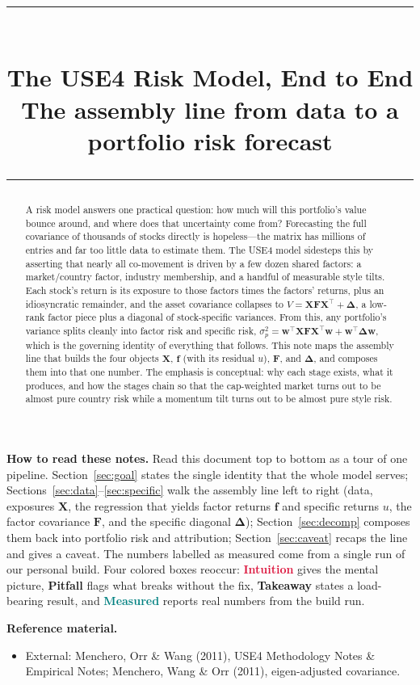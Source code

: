 \documentclass[11pt]{article}
\title{\vspace{-2.2em}
  {\color{steel}\rule{\textwidth}{1.3pt}}\\[0.7em]
  \Huge\bfseries The USE4 Risk Model, End to End\\[0.35em]
  \large\mdseries The assembly line from data to a portfolio risk forecast\\[0.4em]
  {\color{steel}\rule{\textwidth}{0.7pt}}}
\author{}
\date{}
\theoremstyle{definition}
\theoremstyle{plain}
\theoremstyle{remark}
\newcommand{\T}{^{\!\top}}
\newcommand{\wvec}{\mathbf{w}}
\newcommand{\Xmat}{\mathbf{X}}
\newcommand{\Fmat}{\mathbf{F}}
\newcommand{\Del}{\boldsymbol{\Delta}}
\newcommand{\fvec}{\mathbf{f}}
\begin{document}
\maketitle
\thispagestyle{empty}

\begin{abstract}
A risk model answers one practical question: how much will this portfolio's value bounce around, and where does that uncertainty come from? Forecasting the full covariance of thousands of stocks directly is hopeless---the matrix has millions of entries and far too little data to estimate them. The USE4 model sidesteps this by asserting that nearly all co-movement is driven by a few dozen shared factors: a market/country factor, industry membership, and a handful of measurable style tilts. Each stock's return is its exposure to those factors times the factors' returns, plus an idiosyncratic remainder, and the asset covariance collapses to $V = \Xmat\Fmat\Xmat\T + \Del$, a low-rank factor piece plus a diagonal of stock-specific variances. From this, any portfolio's variance splits cleanly into factor risk and specific risk, $\sigma_p^2 = \wvec\T\Xmat\Fmat\Xmat\T\wvec + \wvec\T\Del\wvec$, which is the governing identity of everything that follows. This note maps the assembly line that builds the four objects $\Xmat$, $\fvec$ (with its residual $u$), $\Fmat$, and $\Del$, and composes them into that one number. The emphasis is conceptual: why each stage exists, what it produces, and how the stages chain so that the cap-weighted market turns out to be almost pure country risk while a momentum tilt turns out to be almost pure style risk.
\end{abstract}

\begin{tcolorbox}[colback=paperlt,colframe=ink!30,boxrule=0.4pt,arc=2pt,left=10pt,right=10pt,top=8pt,bottom=8pt]
\textbf{How to read these notes.} Read this document top to bottom as a tour of one pipeline. Section~\ref{sec:goal} states the single identity that the whole model serves; Sections~\ref{sec:data}--\ref{sec:specific} walk the assembly line left to right (data, exposures $\Xmat$, the regression that yields factor returns $\fvec$ and specific returns $u$, the factor covariance $\Fmat$, and the specific diagonal $\Del$); Section~\ref{sec:decomp} composes them back into portfolio risk and attribution; Section~\ref{sec:caveat} recaps the line and gives a caveat. The numbers labelled as measured come from a single run of our personal build. Four colored boxes reoccur: \textcolor{crimson}{\textbf{Intuition}} gives the mental picture, \textcolor{amber}{\textbf{Pitfall}} flags what breaks without the fix, \textcolor{steel}{\textbf{Takeaway}} states a load-bearing result, and \textcolor{teal}{\textbf{Measured}} reports real numbers from the build run.

\smallskip
\textbf{Reference material.}
\begin{itemize}[leftmargin=1.4em,topsep=2pt]
  \item External: Menchero, Orr \& Wang (2011), USE4 Methodology Notes \& Empirical Notes; Menchero, Wang \& Orr (2011), eigen-adjusted covariance.
\end{itemize}
\end{tcolorbox}
\end{document}
